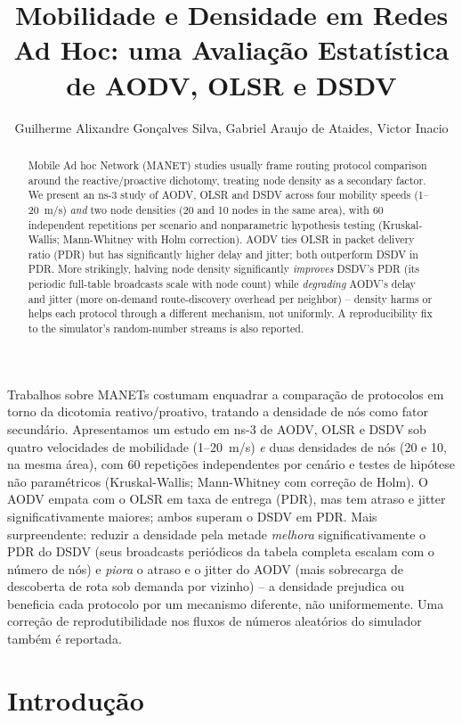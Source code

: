 \documentclass[12pt]{article}
\title{Mobilidade e Densidade em Redes Ad Hoc: uma Avaliação Estatística de AODV, OLSR e DSDV}
\author{Guilherme Alixandre Gonçalves Silva, Gabriel Araujo de Ataides, Victor Inacio}
\begin{document}
\maketitle

\begin{abstract}
Mobile Ad hoc Network (MANET) studies usually frame routing protocol comparison around the reactive/proactive dichotomy, treating node density as a secondary factor. We present an ns-3 study of AODV, OLSR and DSDV across four mobility speeds (1--20~m/s) \emph{and} two node densities (20 and 10 nodes in the same area), with 60 independent repetitions per scenario and nonparametric hypothesis testing (Kruskal-Wallis; Mann-Whitney with Holm correction). AODV ties OLSR in packet delivery ratio (PDR) but has significantly higher delay and jitter; both outperform DSDV in PDR. More strikingly, halving node density significantly \emph{improves} DSDV's PDR (its periodic full-table broadcasts scale with node count) while \emph{degrading} AODV's delay and jitter (more on-demand route-discovery overhead per neighbor) -- density harms or helps each protocol through a different mechanism, not uniformly. A reproducibility fix to the simulator's random-number streams is also reported.
\end{abstract}

\begin{resumo}
Trabalhos sobre MANETs costumam enquadrar a comparação de protocolos em torno da dicotomia reativo/proativo, tratando a densidade de nós como fator secundário. Apresentamos um estudo em ns-3 de AODV, OLSR e DSDV sob quatro velocidades de mobilidade (1--20~m/s) \emph{e} duas densidades de nós (20 e 10, na mesma área), com 60 repetições independentes por cenário e testes de hipótese não paramétricos (Kruskal-Wallis; Mann-Whitney com correção de Holm). O AODV empata com o OLSR em taxa de entrega (PDR), mas tem atraso e jitter significativamente maiores; ambos superam o DSDV em PDR. Mais surpreendente: reduzir a densidade pela metade \emph{melhora} significativamente o PDR do DSDV (seus broadcasts periódicos da tabela completa escalam com o número de nós) e \emph{piora} o atraso e o jitter do AODV (mais sobrecarga de descoberta de rota sob demanda por vizinho) -- a densidade prejudica ou beneficia cada protocolo por um mecanismo diferente, não uniformemente. Uma correção de reprodutibilidade nos fluxos de números aleatórios do simulador também é reportada.
\end{resumo}

\section{Introdução}
\end{document}
